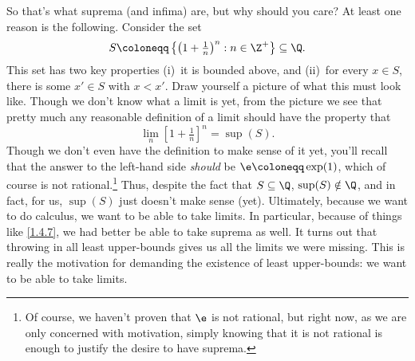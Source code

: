 So that's what suprema (and infima) are, but why should you care?  At least one reason is the following.  Consider the set
\begin{equation}
S\coloneqq \left\{ \left( 1+\tfrac{1}{n}\right) ^n:n\in \Z ^+\right\} \subseteq \Q .
\end{equation}
This set has two key properties (i)~it is bounded above, and (ii)~for every $x\in S$, there is some $x'\in S$ with $x<x'$.  Draw yourself a picture of what this must look like.  Though we don't know what a limit is yet, from the picture we see that pretty much any reasonable definition of a limit should have the property that
\begin{equation}\label{1.4.7}
\lim _n\left[ 1+\tfrac{1}{n}\right] ^n=\sup (S).
\end{equation}
Though we don't even have the definition to make sense of it yet, you'll recall that the answer to the left-hand side \emph{should} be $\e \coloneqq \exp (1)$, which of course is not rational.\footnote{Of course, we haven't proven that $\e$ is not rational, but right now, as we are only concerned with motivation, simply knowing that it is not rational is enough to justify the desire to have suprema.}  Thus, despite the fact that $S\subseteq \Q$, $\sup (S)\notin \Q$, and in fact, for us, $\sup (S)$ just doesn't make sense (yet).  Ultimately, because we want to do calculus, we want to be able to take limits.  In particular, because of things like \eqref{1.4.7}, we had better be able to take suprema as well.  It turns out that throwing in all least upper-bounds gives us all the limits we were missing.  This is really the motivation for demanding the existence of least upper-bounds:  we want to be able to take limits.

